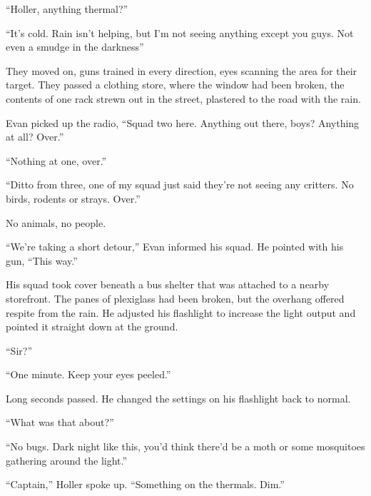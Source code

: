 ``Holler, anything thermal?''



``It's cold.  Rain isn't helping, but I'm not seeing anything except you guys.  Not even a smudge in the darkness''



They moved on, guns trained in every direction, eyes scanning the area for their target.  They passed a clothing store, where the window had been broken, the contents of one rack strewn out in the street, plastered to the road with the rain.



Evan picked up the radio, ``Squad two here.  Anything out there, boys?  Anything at all? Over.''



``Nothing at one, over.''



``Ditto from three, one of my squad just said they're not seeing any critters.  No birds, rodents or strays.  Over.''



No animals, no people.



``We're taking a short detour,'' Evan informed his squad.  He pointed with his gun, ``This way.''



His squad took cover beneath a bus shelter that was attached to a nearby storefront.  The panes of plexiglass had been broken, but the overhang offered respite from the rain.  He adjusted his flashlight to increase the light output and pointed it straight down at the ground.



``Sir?''



``One minute.  Keep your eyes peeled.''



Long seconds passed.  He changed the settings on his flashlight back to normal.



``What was that about?''



``No bugs.  Dark night like this, you'd think there'd be a moth or some mosquitoes gathering around the light.''



``Captain,'' Holler spoke up.  ``Something on the thermals.  Dim.''



